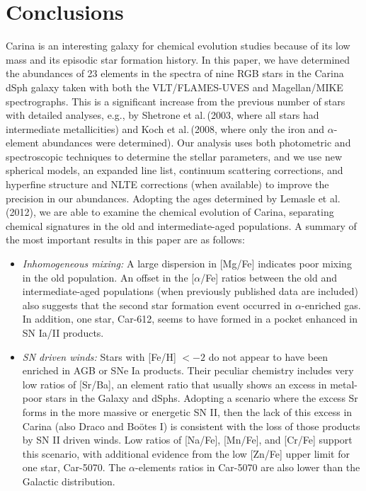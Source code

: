 \documentclass{emulateapj}
\newcommand\etal{{\rm et al.\,}}
\begin{document}
 


\section{Conclusions}

Carina is an interesting galaxy for chemical evolution studies
because of its low mass and its episodic star formation history.
In this paper, we have determined the abundances of 23 elements 
in the spectra of nine RGB stars in the Carina dSph galaxy taken 
with both the VLT/FLAMES-UVES and Magellan/MIKE spectrographs.    
This is a significant increase from the previous number of stars with 
detailed analyses, e.g., by Shetrone \etal (2003, where all 
stars had intermediate metallicities) and Koch \etal (2008, 
where only the iron and $\alpha$-element abundances were determined).  
%
Our analysis uses both photometric and spectroscopic techniques to
determine the stellar parameters, and we use new spherical models, an 
expanded line list, continuum scattering corrections, and 
hyperfine structure and NLTE corrections (when available) to  
improve the precision in our abundances.   Adopting the ages determined
by Lemasle \etal (2012), we are able to examine the chemical evolution
of Carina, separating chemical signatures in the old and intermediate-aged
populations. 
%
A summary of the most important results in this paper are as follows:

\begin{itemize}

\item  {\it Inhomogeneous mixing:}   A large dispersion in [Mg/Fe] 
       indicates poor mixing in the old population.   
       An offset in the [$\alpha$/Fe] ratios between the old 
       and intermediate-aged populations 
       (when previously published data
       are included)
       also suggests that the second 
       star formation event occurred in $\alpha$-enriched gas.  
       In addition, one star, Car-612, seems to have
       formed in a pocket enhanced in SN Ia/II products.

\item  {\it SN driven winds:} Stars with [Fe/H] $< -2$ do not appear to have
       been enriched in AGB or SNe Ia products.    Their peculiar chemistry
       includes very low ratios of [Sr/Ba], an element ratio that usually
       shows an excess in metal-poor stars in the Galaxy and dSphs.   
       Adopting a scenario where the excess Sr forms in the more massive or 
       energetic SN II, then the lack of this excess in Carina (also Draco
       and Bo\"otes I) is consistent with the loss of those products by 
       SN II driven winds.   Low ratios of [Na/Fe], [Mn/Fe], and [Cr/Fe] 
       support this scenario, with additional evidence from the low [Zn/Fe]
       upper limit for one star, Car-5070.    The $\alpha$-elements ratios
       in Car-5070 are also lower than the Galactic distribution.
       

\end{itemize}
\end{document}
